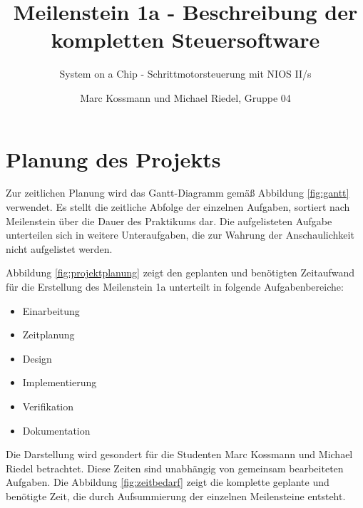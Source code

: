 \documentclass[ngerman,fontsize=12pt , paper=a4 , twoside=false , DIV12 , BCOR=1cm ,
numbers=enddot , listof=totoc , bibliography=totoc , index=totoc ,
headings=small , headlines=1.5 , final]{scrbook}
\title{Meilenstein 1a - Beschreibung der kompletten Steuersoftware}
\subtitle{System on a Chip - Schrittmotorsteuerung mit NIOS II/s}
\author{Marc Kossmann und Michael Riedel, Gruppe 04}
\begin{document}
\onehalfspacing

  {
    \pagestyle{empty}
    \frontmatter

          
    
    \setcounter{page}{0}%
    \pagestyle{scrplain}%
  }{
          \maketitle
        \thispagestyle{empty}
  }
{
  \setcounter{tocdepth}{2}
  \tableofcontents
  \newpage%
}

\pagestyle{scrheadings}%
  {
    \mainmatter
      }{
      }

\chapter{Planung des Projekts}\label{planung-des-projekts}

Zur zeitlichen Planung wird das Gantt-Diagramm gemäß Abbildung
\ref{fig:gantt} verwendet. Es stellt die zeitliche Abfolge der einzelnen
Aufgaben, sortiert nach Meilenstein über die Dauer des Praktikums dar.
Die aufgelisteten Aufgabe unterteilen sich in weitere Unteraufgaben, die
zur Wahrung der Anschaulichkeit nicht aufgelistet werden.

Abbildung \ref{fig:projektplanung} zeigt den geplanten und benötigten
Zeitaufwand für die Erstellung des Meilenstein 1a unterteilt in folgende
Aufgabenbereiche:

\begin{itemize}
\itemsep1pt\parskip0pt
\item
  Einarbeitung
\item
  Zeitplanung
\item
  Design
\item
  Implementierung
\item
  Verifikation
\item
  Dokumentation
\end{itemize}

Die Darstellung wird gesondert für die Studenten Marc Kossmann und
Michael Riedel betrachtet. Diese Zeiten sind unabhängig von gemeinsam
bearbeiteten Aufgaben. Die Abbildung \ref{fig:zeitbedarf} zeigt die
komplette geplante und benötigte Zeit, die durch Aufsummierung der
einzelnen Meilensteine entsteht.
\end{document}
